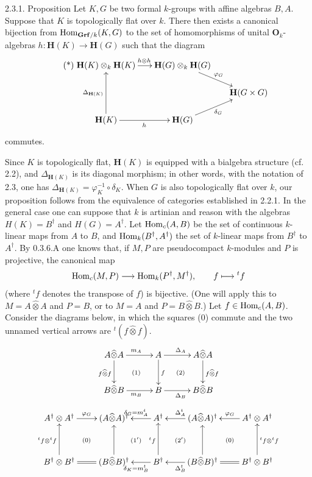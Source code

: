 \begin{enonce}{2.3.1. Proposition}{}\label{VIIB.2.3.1}
Let $K,G$ be two formal $k$-groups with affine algebras $B,A$. Suppose that $K$ is topologically flat over $k$. There then exists a canonical bijection from $\operatorname{Hom}_{\mathbf{Grf}/k}(K,G)$ to the set of homomorphisms of unital $\mathbf O_k$-algebras $h:\mathbf H(K)\to\mathbf H(G)$ such that the diagram
\begin{equation}\tag{*}
\xymatrix@C=16pt@R=16pt{
\mathbf H(K)\otimes_k\mathbf H(K)\ar[r]^{h\otimes h}&\mathbf H(G)\otimes_k\mathbf H(G)\ar[dr]^{\varphi_G}&\\
&&\mathbf H(G\times G)\\
\mathbf H(K)\ar[uu]^{\Delta_{\mathbf H(K)}}\ar[r]_h&\mathbf H(G)\ar[ur]_{\delta_G}&}
\end{equation}
commutes.
\end{enonce}
Since $K$ is topologically flat, $\mathbf H(K)$ is equipped with a bialgebra structure (cf. 2.2), and $\Delta_{\mathbf H(K)}$ is its diagonal morphism; in other words, with the notation of 2.3, one has $\Delta_{\mathbf H(K)}=\varphi_K^{-1}\circ\delta_K$. When $G$ is also topologically flat over $k$, our proposition follows from the equivalence of categories established in 2.2.1.
In the general case one can suppose that $k$ is artinian and reason with the algebras $H(K)=B^\dagger$ and $H(G)=A^\dagger$. Let $\operatorname{Hom}_c(A,B)$ be the set of continuous $k$-linear maps from $A$ to $B$, and $\operatorname{Hom}_k(B^\dagger,A^\dagger)$ the set of $k$-linear maps from $B^\dagger$ to $A^\dagger$.
By 0.3.6.A one knows that, if $M,P$ are pseudocompact $k$-modules and $P$ is projective, the canonical map
\[
\operatorname{Hom}_c(M,P)\longrightarrow\operatorname{Hom}_k(P^\dagger,M^\dagger),\qquad f\longmapsto{}^t f
\]
(where ${}^t f$ denotes the transpose of $f$) is bijective. (One will apply this to $M=A\widehat\otimes A$ and $P=B$, or to $M=A$ and $P=B\widehat\otimes B$.)
Let $f\in\operatorname{Hom}_c(A,B)$. Consider the diagrams below, in which the squares (0) commute and the two unnamed vertical arrows are ${}^t(f\widehat\otimes f)$.
\[
\xymatrix@C=30pt@R=26pt{
A\widehat\otimes A\ar[r]^{m_A}\ar[d]_{f\widehat\otimes f}\ar@{}[dr]|{(1)}&A\ar[r]^{\Delta_A}\ar[d]^f\ar@{}[dr]|{(2)}&A\widehat\otimes A\ar[d]^{f\widehat\otimes f}\\
B\widehat\otimes B\ar[r]_{m_B}&B\ar[r]_{\Delta_B}&B\widehat\otimes B}
\]
\[
\xymatrix@C=22pt@R=34pt{
A^\dagger\otimes A^\dagger\ar[r]^{\varphi_G}\ar@{}[dr]|{(0)}&(A\widehat\otimes A)^\dagger\ar@{}[dr]|{(1')}&A^\dagger\ar[l]_{\delta_G=m_A^t}\ar@{}[dr]|{(2')}&(A\widehat\otimes A)^\dagger\ar[l]_{\Delta_A^t}\ar@{}[dr]|{(0)}&A^\dagger\otimes A^\dagger\ar[l]_{\varphi_G}\\
B^\dagger\otimes B^\dagger\ar[u]^{{}^t f\otimes{}^t f}\ar@{=}[r]&(B\widehat\otimes B)^\dagger\ar[u]&B^\dagger\ar[u]^{{}^t f}\ar[l]^{\delta_K=m_B^t}&(B\widehat\otimes B)^\dagger\ar[u]\ar[l]^{\Delta_B^t}&B^\dagger\otimes B^\dagger\ar[u]_{{}^t f\otimes{}^t f}\ar@{=}[l]}
\]

